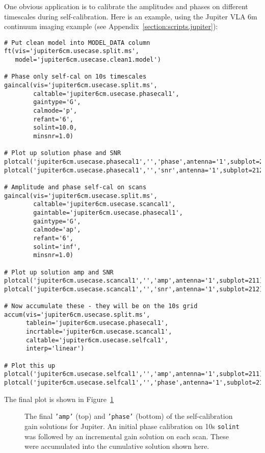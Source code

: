 One obvious application is to calibrate the amplitudes and phases
on different timescales during self-calibration.
Here is an example, using the Jupiter VLA 6m continuum imaging 
example (see Appendix~\ref{section:scripts.jupiter}):
\small
\begin{verbatim}
# Put clean model into MODEL_DATA column
ft(vis='jupiter6cm.usecase.split.ms',
   model='jupiter6cm.usecase.clean1.model')

# Phase only self-cal on 10s timescales
gaincal(vis='jupiter6cm.usecase.split.ms',
        caltable='jupiter6cm.usecase.phasecal1',
        gaintype='G',
        calmode='p',
        refant='6',
        solint=10.0,
        minsnr=1.0)

# Plot up solution phase and SNR
plotcal('jupiter6cm.usecase.phasecal1','','phase',antenna='1',subplot=211)
plotcal('jupiter6cm.usecase.phasecal1','','snr',antenna='1',subplot=212)

# Amplitude and phase self-cal on scans
gaincal(vis='jupiter6cm.usecase.split.ms',
        caltable='jupiter6cm.usecase.scancal1',
        gaintable='jupiter6cm.usecase.phasecal1',
        gaintype='G',
        calmode='ap',
        refant='6',
        solint='inf',
        minsnr=1.0)

# Plot up solution amp and SNR
plotcal('jupiter6cm.usecase.scancal1','','amp',antenna='1',subplot=211)
plotcal('jupiter6cm.usecase.scancal1','','snr',antenna='1',subplot=212)

# Now accumulate these - they will be on the 10s grid
accum(vis='jupiter6cm.usecase.split.ms',
      tablein='jupiter6cm.usecase.phasecal1',
      incrtable='jupiter6cm.usecase.scancal1',
      caltable='jupiter6cm.usecase.selfcal1',
      interp='linear')

# Plot this up
plotcal('jupiter6cm.usecase.selfcal1','','amp',antenna='1',subplot=211)
plotcal('jupiter6cm.usecase.selfcal1','','phase',antenna='1',subplot=212)
\end{verbatim}
\normalsize
The final plot is shown in Figure~\ref{fig:accum_jupiter}

\begin{figure}[h!]
\begin{center}
\caption{\label{fig:accum_jupiter} The final {\tt 'amp'} (top) and
{\tt 'phase'} (bottom) of the self-calibration gain solutions
for Jupiter.  An initial phase calibration on 10s {\tt solint} was
followed by an incremental gain solution on each scan.  These
were accumulated into the cumulative solution shown here.
}
\hrulefill
\end{center}
\end{figure}


